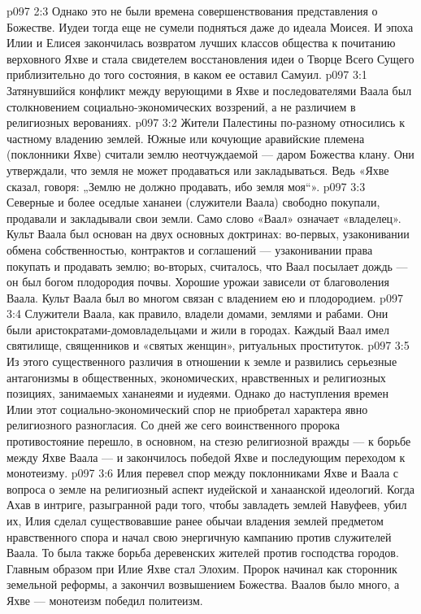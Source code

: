 \vs p097 2:3 Однако это не были времена совершенствования представления о Божестве. Иудеи тогда еще не сумели подняться даже до идеала Моисея. И эпоха Илии и Елисея закончилась возвратом лучших классов общества к почитанию верховного Яхве и стала свидетелем восстановления идеи о Творце Всего Сущего приблизительно до того состояния, в каком ее оставил Самуил.
\vs p097 3:1 Затянувшийся конфликт между верующими в Яхве и последователями Ваала был столкновением социально\hyp{}экономических воззрений, а не различием в религиозных верованиях.
\vs p097 3:2 \pc Жители Палестины по\hyp{}разному относились к частному владению землей. Южные или кочующие аравийские племена (поклонники Яхве) считали землю неотчуждаемой --- даром Божества клану. Они утверждали, что земля не может продаваться или закладываться. Ведь «Яхве сказал, говоря: „Землю не должно продавать, ибо земля моя“».
\vs p097 3:3 Северные и более оседлые хананеи (служители Ваала) свободно покупали, продавали и закладывали свои земли. Само слово «Ваал» означает «владелец». Культ Ваала был основан на двух основных доктринах: во\hyp{}первых, узаконивании обмена собственностью, контрактов и соглашений --- узаконивании права покупать и продавать землю; во\hyp{}вторых, считалось, что Ваал посылает дождь --- он был богом плодородия почвы. Хорошие урожаи зависели от благоволения Ваала. Культ Ваала был во многом связан с  владением ею и плодородием.
\vs p097 3:4 Служители Ваала, как правило, владели домами, землями и рабами. Они были аристократами\hyp{}домовладельцами и жили в городах. Каждый Ваал имел святилище, священников и «святых женщин», ритуальных проституток.
\vs p097 3:5 Из этого существенного различия в отношении к земле и развились серьезные антагонизмы в общественных, экономических, нравственных и религиозных позициях, занимаемых хананеями и иудеями. Однако до наступления времен Илии этот социально\hyp{}экономический спор не приобретал характера явно религиозного разногласия. Со дней же сего воинственного пророка противостояние перешло, в основном, на стезю религиозной вражды --- к борьбе между Яхве  Ваала --- и закончилось победой Яхве и последующим переходом к монотеизму.
\vs p097 3:6 Илия перевел спор между поклонниками Яхве и Ваала с вопроса о земле на религиозный аспект иудейской и ханаанской идеологий. Когда Ахав в интриге, разыгранной ради того, чтобы завладеть землей Навуфеев, убил их, Илия сделал существовавшие ранее обычаи владения землей предметом нравственного спора и начал свою энергичную кампанию против служителей Ваала. То была также борьба деревенских жителей против господства городов. Главным образом при Илие Яхве стал Элохим. Пророк начинал как сторонник земельной реформы, а закончил возвышением Божества. Ваалов было много, а Яхве ---  монотеизм победил политеизм.
